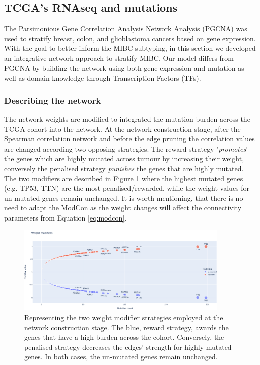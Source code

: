 \subsection{TCGA's RNAseq and mutations} \label{s:N_I:weights}


The Parsimonious Gene Correlation Analysis Network Analysis (PGCNA) was used to stratify breast, colon, and glioblastoma cancers \cite{Care2019-ij,Tanner2023-wa} based on gene expression. With the goal to better inform the MIBC subtyping, in this section we developed an integrative network approach to stratify MIBC. Our model differs from PGCNA by building the network using both gene expression and mutation as well as  domain knowledge through Transcription Factors (TFs).

\subsubsection{Describing the network} \label{s:N_I:tum_describe}

The network weights are modified to integrated the mutation burden across the TCGA cohort into the network. At the network construction stage, after the Spearman correlation network and before the edge pruning the correlation values are changed according two opposing strategies. The reward strategy '\textit{promotes}' the genes which are highly mutated across tumour by increasing their weight, conversely the penalised strategy \textit{punishes} the genes that are highly mutated. The two modifiers are described in Figure \ref{fig:N_I:modifiers} where the highest mutated genes (e.g. TP53, TTN) are the most penalised/rewarded, while the weight values for un-mutated genes remain unchanged. It is worth mentioning, that there is no need to adapt the ModCon as the weight changes will affect the connectivity parameters from Equation \ref{eq:modcon}.

\begin{figure}[!htb]    \centering\includegraphics[width=0.9\textwidth,height=0.9\textheight,keepaspectratio]{Sections/Network_I/Resources/Methods/modifiers.png}
    \caption{Representing the two weight modifier strategies employed at the network construction stage. The blue, reward strategy, awards the genes that have a high burden across the cohort. Conversely, the  penalised strategy decreases the edges' strength for highly mutated genes. In both cases, the un-mutated genes remain unchanged.}
    \label{fig:N_I:modifiers}
\end{figure}



